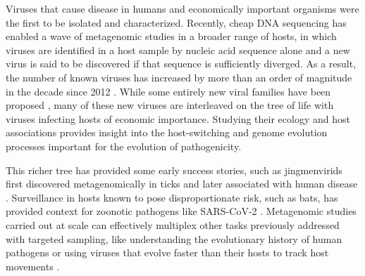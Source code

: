 \documentclass[11pt,twocolumn]{article}
\begin{document}
\twocolumn




Viruses that cause disease in humans and economically important organisms were the first to be isolated and characterized.
Recently, cheap DNA sequencing has enabled a wave of metagenomic studies in a broader range of hosts, in which viruses are identified in a host sample by nucleic acid sequence alone and a new virus is said to be discovered if that sequence is sufficiently diverged. As a result, the number of known viruses has increased by more than an order of magnitude in the decade since 2012 \citep{roux_metagenomics_2021}.
While some entirely new viral families have been proposed \citep{obbard_new_2020}, many of these new viruses are interleaved on the tree of life with viruses infecting hosts of economic importance. Studying their ecology \citep{shi_stable_2019} and host associations \citep{li_unprecedented_2015,shi_evolutionary_2018} provides insight into the host-switching and genome evolution processes important for the evolution of pathogenicity.


This richer tree has provided some early success stories, such as jingmenvirids first discovered metagenomically in ticks \citep{qin_tick-borne_2014} and later associated with human disease \citep{wang_new_2019}. Surveillance in hosts known to pose disproportionate risk, such as bats, \citep{ge_coexistence_2016} has provided context for zoonotic pathogens like SARS-CoV-2 \citep{wu_new_2020}.
Metagenomic studies carried out at scale can effectively multiplex other tasks previously addressed with targeted sampling, like understanding the evolutionary history of human pathogens \citep{keele_chimpanzee_2006} or using viruses that evolve faster than their hosts to track host movements \citep{wheeler_spatial_2010}.
\end{document}
